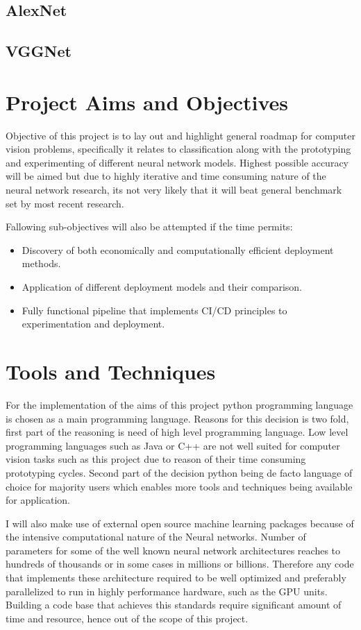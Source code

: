 \documentclass[12pt, twoside, a4paper]{article}
\begin{document}
\subsection{AlexNet}
\subsection{VGGNet}
\clearpage

\section{Project Aims and Objectives}
\indent Objective of this project is to lay out and highlight general roadmap for computer vision problems, specifically it relates to classification along with the prototyping and experimenting of different neural network models. Highest possible accuracy will be aimed but due to highly iterative and time consuming nature of the neural network research, its not very likely that it will beat general benchmark set by most recent research.

Fallowing sub-objectives will also be attempted if the time permits:
\begin{itemize}
    \item Discovery of both economically and computationally efficient deployment methods.
    \item Application of different deployment models and their comparison.
    \item Fully functional pipeline that implements CI/CD principles to experimentation and deployment.
\end{itemize}
\clearpage

\section{Tools and Techniques}
For the implementation of the aims of this project python programming language is chosen as a main programming language. Reasons for this decision is two fold, first part of the reasoning is need of high level programming language. Low level programming languages such as Java or C++ are not well suited for computer vision tasks such as this project due to reason of their time consuming prototyping cycles. Second part of the decision python being de facto language of choice for majority users which enables more tools and techniques being available for application. 

I will also make use of external open source machine learning packages because of the intensive computational nature of the Neural networks. Number of parameters for some of the well known neural network architectures reaches to hundreds of thousands or in some cases in millions or billions. Therefore any code that implements these architecture required to be well optimized and preferably parallelized to run in highly performance hardware, such as the GPU units. Building a code base that achieves this standards require significant amount of time and resource, hence out of the scope of this project. 
\end{document}
